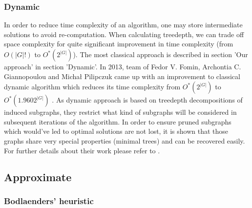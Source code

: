 \subsubsection{Dynamic}
In order to reduce time complexity of an algorithm, one may store intermediate solutions to avoid re-computation. When calculating treedepth, we can trade off space complexity for quite significant improvement in time complexity (from $O\left(\left|G\right|!\right)$ to $O^{*}\left(2^{\left|G\right|}\right)$). The most classical approach is described in section 'Our approach' in section 'Dynamic'. In 2013, team of Fedor V. Fomin, Archontia C. Giannopoulou and Michał Pilipczuk came up with an improvement to classical dynamic algorithm which reduces its time complexity from $O^{*}\left(2^{\left|G\right|}\right)$ to $O^{*}\left(1.9602^{\left|G\right|}\right)$ \cite{mimuw_td}. As dynamic approach is based on treedepth decompositions of induced subgraphs, they restrict what kind of subgraphs will be considered in subsequent iterations of the algorithm. In order to ensure pruned subgraphs which would've led to optimal solutions are not lost, it is shown that those graphs share very special properties (minimal trees) and can be recovered easily. For further details about their work please refer to \cite{mimuw_td}.
\subsection{Approximate}
\subsubsection{Bodlaenders' heuristic}
